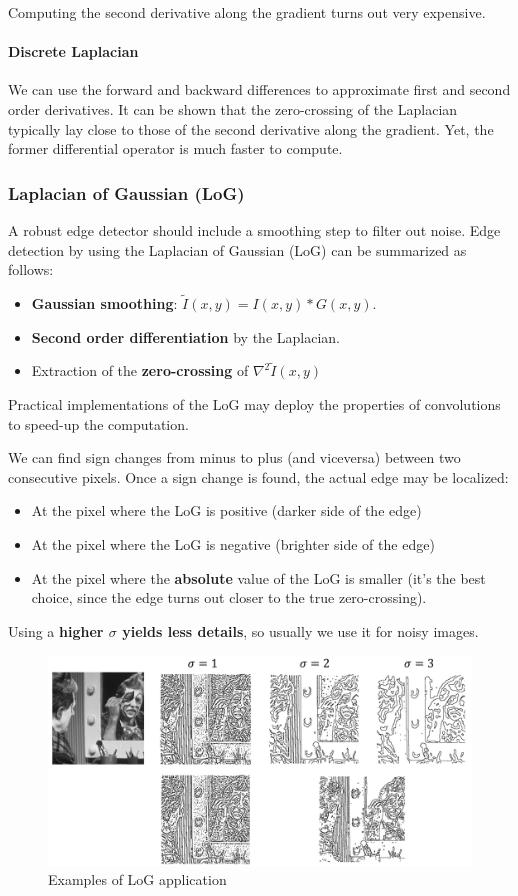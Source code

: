 Computing the second derivative along the gradient turns out very expensive.

\paragraph{Discrete Laplacian}
We can use the forward and backward differences to approximate first and second order derivatives.
It can be shown that the zero-crossing of the Laplacian typically lay close to those of the second derivative along the gradient.
Yet, the former differential operator is much faster to compute.

\subsubsection{Laplacian of Gaussian (LoG)}
A robust edge detector should include a smoothing step to filter out noise.
Edge detection by using the Laplacian of Gaussian (LoG) can be summarized as follows:
\begin{itemize}
  \item \textbf{Gaussian smoothing}: $\tilde{I}(x,y) = I(x,y) * G(x,y)$.
  \item \textbf{Second order differentiation} by the Laplacian.
  \item Extraction of the \textbf{zero-crossing} of $\nabla^2 \tilde{I}(x,y)$
\end{itemize}

Practical implementations of the LoG may deploy the properties of convolutions to speed-up the computation.

We can find sign changes from minus to plus (and viceversa) between two consecutive pixels.
Once a sign change is found, the actual edge may be localized:
\begin{itemize}
  \item At the pixel where the LoG is positive (darker side of the edge)
  \item At the pixel where the LoG is negative (brighter side of the edge)
  \item At the pixel where the \textbf{absolute} value of the LoG is smaller (it's the best choice, since the edge turns out closer to the true zero-crossing).
\end{itemize}

Using a \textbf{higher $\sigma$ yields less details}, so usually we use it for noisy images.

\begin{figure}[htbp]
  \centering
  \includegraphics[width=0.7\linewidth]{./img/log_application.jpg}
  \caption{Examples of LoG application}
  \label{fig:log_application}
\end{figure}


